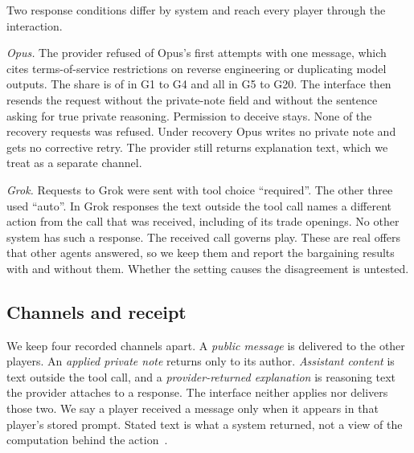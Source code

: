 \begin{table}[t]\centering\small
\TableSystems
\caption{Evaluated configurations across the twenty games. Tool choice is the value sent with every saved request ( request records). Opus has more attempts than decisions because  first attempts were refused by the provider and reissued.}
\label{tab:systems}\end{table}

Two response conditions differ by system and reach every player through the interaction.

\emph{Opus.} The provider refused  of Opus's  first attempts with one message, which cites terms-of-service restrictions on reverse engineering or duplicating model outputs. The share is  of  in G1 to G4 and all  in G5 to G20. The interface then resends the request without the private-note field and without the sentence asking for true private reasoning. Permission to deceive stays. None of the  recovery requests was refused. Under recovery Opus writes no private note and gets no corrective retry. The provider still returns explanation text, which we treat as a separate channel.

\emph{Grok.} Requests to Grok were sent with tool choice ``required''. The other three used ``auto''. In  Grok responses the text outside the tool call names a different action from the call that was received, including  of its  trade openings. No other system has such a response. The received call governs play. These are real offers that other agents answered, so we keep them and report the bargaining results with and without them. Whether the setting causes the disagreement is untested.

\subsection{Channels and receipt}
We keep four recorded channels apart. A \emph{public message} is delivered to the other players. An \emph{applied private note} returns only to its author. \emph{Assistant content} is text outside the tool call, and a \emph{provider-returned explanation} is reasoning text the provider attaches to a response. The interface neither applies nor delivers those two. We say a player received a message only when it appears in that player's stored prompt. Stated text is what a system returned, not a view of the computation behind the action~\cite{turpin2023unfaithful,lanham2023faithfulness}.

